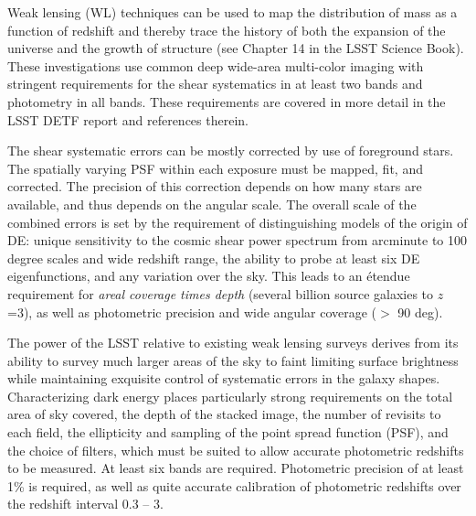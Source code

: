 Weak lensing (WL) techniques can be used to map the distribution of mass as a function
of redshift and thereby trace the history of both the expansion of the universe and the
growth of structure (see Chapter 14 in the LSST Science Book). These investigations use
common deep wide-area multi-color imaging with stringent
requirements for the shear systematics in at least two bands and photometry in all bands.
These requirements are covered in more detail in the LSST DETF report and references therein.

The shear systematic errors can be mostly corrected by use of foreground stars.
The spatially varying PSF within each exposure must be mapped, fit, and corrected. The precision of this
correction depends on how many stars are available, and thus depends on the angular scale.
The overall scale of the combined errors is set by the requirement of distinguishing models
of the origin of DE: unique sensitivity to the cosmic shear power spectrum from arcminute
to 100 degree scales and wide redshift range, the ability to probe at least six DE
eigenfunctions, and any variation over the sky. This leads to an \'{e}tendue requirement
for \textit{areal coverage times depth} (several billion source galaxies to $z$=3), as well
as photometric precision and wide angular coverage ($>$ 90 deg).

The power of the LSST relative to existing weak lensing surveys derives from its
ability to survey much larger areas of the sky to faint limiting
surface brightness while maintaining exquisite control of systematic errors in the
galaxy shapes. Characterizing dark energy places particularly strong
requirements on the total area of sky covered, the depth of the stacked image, the
number of revisits to each field, the ellipticity and sampling of the point spread
function (PSF), and the choice of filters, which must be suited to allow accurate
photometric redshifts to be measured. At least six bands are required. Photometric precision of at
least 1\% is required, as well as quite accurate calibration of photometric redshifts over the
redshift interval 0.3 -- 3.

